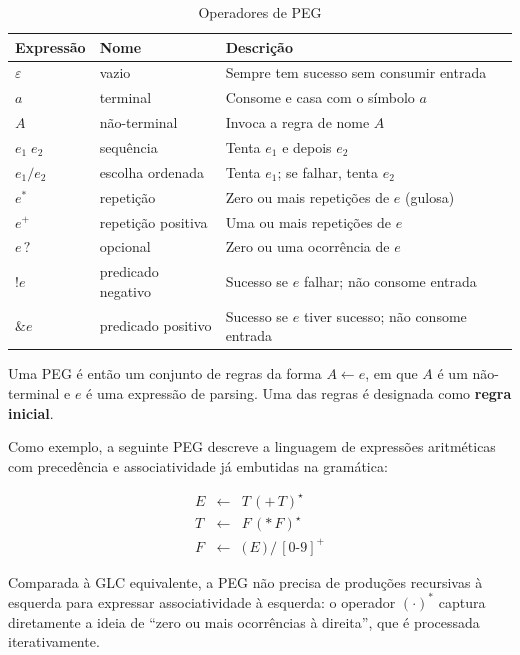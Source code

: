 \begin{table}[ht]
  \centering
  \begin{tabular}{lll}
    \toprule
    Expressão & Nome & Descrição \\
    \midrule
    $\varepsilon$   & vazio              & Sempre tem sucesso sem
    consumir entrada \\
    $a$             & terminal           & Consome e casa com o símbolo $a$ \\
    $A$             & não-terminal       & Invoca a regra de nome $A$ \\
    $e_1\; e_2$     & sequência          & Tenta $e_1$ e depois $e_2$ \\
    $e_1 / e_2$     & escolha ordenada   & Tenta $e_1$; se falhar,
    tenta $e_2$ \\
    $e^*$           & repetição          & Zero ou mais repetições de
    $e$ (gulosa) \\
    $e^+$           & repetição positiva & Uma ou mais repetições de $e$ \\
    $e\,?$          & opcional           & Zero ou uma ocorrência de $e$ \\
    $!e$            & predicado negativo & Sucesso se $e$ falhar; não
    consome entrada \\
    $\& e$          & predicado positivo & Sucesso se $e$ tiver
    sucesso; não consome entrada \\
    \bottomrule
  \end{tabular}
  \caption{Operadores de PEG}
\end{table}

Uma PEG é então um conjunto de regras da forma \(A \leftarrow e\), em
que \(A\) é um não-terminal e \(e\) é uma expressão de parsing. Uma
das regras é designada como \textbf{regra inicial}.

Como exemplo, a seguinte PEG descreve a linguagem de expressões
aritméticas com precedência e associatividade já embutidas na gramática:

\[
  \begin{array}{lcl}
    E & \leftarrow & T\,(\texttt{+}\, T)^\star\\
    T & \leftarrow & F\,(*\, F)^\star\\
    F & \leftarrow & \texttt{(}\, E\, \texttt{)} \,/\, [0\text{-}9]^+
  \end{array}
\]

Comparada à GLC equivalente, a PEG não precisa de produções
recursivas à esquerda para expressar associatividade à esquerda: o
operador \((\cdot)^*\) captura diretamente a ideia de ``zero ou mais
ocorrências à direita'', que é processada iterativamente.

